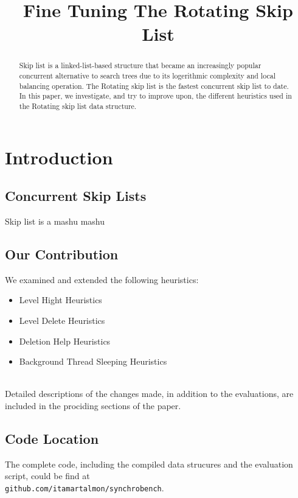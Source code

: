 \documentclass{article}
\title{Fine Tuning The Rotating Skip List}
\begin{document}
%
\maketitle
%
\begin{abstract}
Skip list \cite{C3} is a linked-list-based structure that became an increasingly popular concurrent alternative to search trees due to its logerithmic complexity and local balancing operation. The Rotating skip list \cite{C1} is the fastest concurrent skip list to date. In this paper, we investigate, and try to improve upon, the different heuristics used in the Rotating skip list data structure.
\end{abstract}
%
\section{Introduction}
\label{sec:intro}

\subsection{Concurrent Skip Lists}
\label{ssec:csl}
Skip list is a mashu mashu

\subsection{Our Contribution}
\label{ssec:oc}

We examined and extended the following heuristics:

\begin{itemize}
	\item Level Hight Heuristics
	\item Level Delete Heuristics 
	\item Deletion Help Heuristics 
	\item Background Thread Sleeping Heuristics 
\end{itemize}
\\
Detailed descriptions of the changes made, in addition to the evaluations, are included in the prociding sections of the paper.

\subsection{Code Location}
\label{ssec:cl}
The complete code, including the compiled data strucures and the evaluation script, could be find at \\\texttt{github.com/itamartalmon/synchrobench}.
\end{document}
